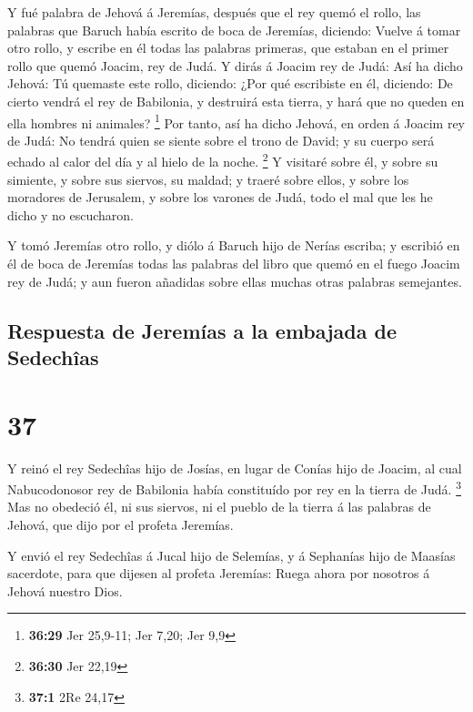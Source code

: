  Y fué palabra de Jehová á Jeremías, después que el rey
quemó el rollo, las palabras que Baruch había escrito de boca de
Jeremías, diciendo:  Vuelve á tomar otro rollo, y escribe
en él todas las palabras primeras, que estaban en el primer rollo que
quemó Joacim, rey de Judá.  Y dirás á Joacim rey de Judá:
Así ha dicho Jehová: Tú quemaste este rollo, diciendo: ¿Por qué
escribiste en él, diciendo: De cierto vendrá el rey de Babilonia, y
destruirá esta tierra, y hará que no queden en ella hombres ni animales?
\footnote{\textbf{36:29} Jer 25,9-11; Jer 7,20; Jer 9,9} 
Por tanto, así ha dicho Jehová, en orden á Joacim rey de Judá: No tendrá
quien se siente sobre el trono de David; y su cuerpo será echado al
calor del día y al hielo de la noche. \footnote{\textbf{36:30} Jer 22,19}
 Y visitaré sobre él, y sobre su simiente, y sobre sus
siervos, su maldad; y traeré sobre ellos, y sobre los moradores de
Jerusalem, y sobre los varones de Judá, todo el mal que les he dicho y
no escucharon.

 Y tomó Jeremías otro rollo, y diólo á Baruch hijo de
Nerías escriba; y escribió en él de boca de Jeremías todas las palabras
del libro que quemó en el fuego Joacim rey de Judá; y aun fueron
añadidas sobre ellas muchas otras palabras semejantes.

\hypertarget{respuesta-de-jeremuxedas-a-la-embajada-de-sedechuxeeas}{%
\subsection{Respuesta de Jeremías a la embajada de
Sedechîas}\label{respuesta-de-jeremuxedas-a-la-embajada-de-sedechuxeeas}}

\hypertarget{section-36}{%
\section{37}\label{section-36}}

 Y reinó el rey Sedechîas hijo de Josías, en lugar de
Conías hijo de Joacim, al cual Nabucodonosor rey de Babilonia había
constituído por rey en la tierra de Judá. \footnote{\textbf{37:1} 2Re
  24,17}  Mas no obedeció él, ni sus siervos, ni el pueblo
de la tierra á las palabras de Jehová, que dijo por el profeta Jeremías.

 Y envió el rey Sedechîas á Jucal hijo de Selemías, y á
Sephanías hijo de Maasías sacerdote, para que dijesen al profeta
Jeremías: Ruega ahora por nosotros á Jehová nuestro Dios.


